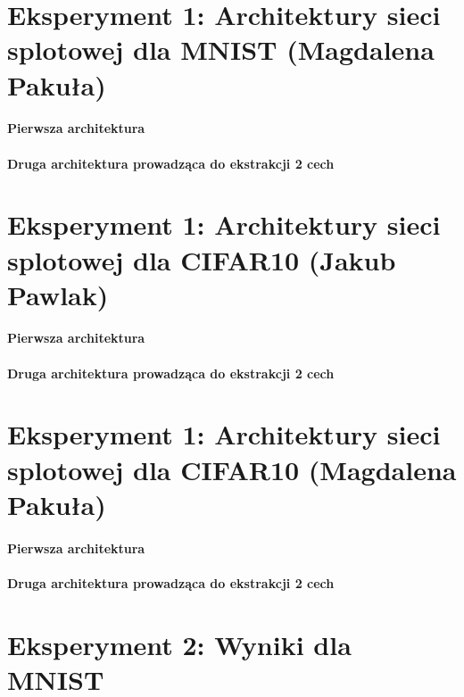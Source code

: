 \documentclass[10pt]{article}
\begin{document}
\pagebreak
\section{Eksperyment 1: Architektury sieci splotowej dla MNIST (Magdalena Pakuła)}\label{sec:ex1-pakula_mnist}

\paragraph{Pierwsza architektura}
\paragraph{Druga architektura prowadząca do ekstrakcji 2 cech}

\pagebreak
\section{Eksperyment 1: Architektury sieci splotowej dla CIFAR10 (Jakub Pawlak)}\label{sec:ex1-pawlak_cifar}

\paragraph{Pierwsza architektura}
\paragraph{Druga architektura prowadząca do ekstrakcji 2 cech}

\pagebreak
\section{Eksperyment 1: Architektury sieci splotowej dla CIFAR10 (Magdalena Pakuła)}\label{sec:ex1-pakula_cifar}

\paragraph{Pierwsza architektura}
\paragraph{Druga architektura prowadząca do ekstrakcji 2 cech}

\pagebreak
\section{Eksperyment 2: Wyniki dla MNIST}\label{sec:ex2_mnist}
\end{document}
